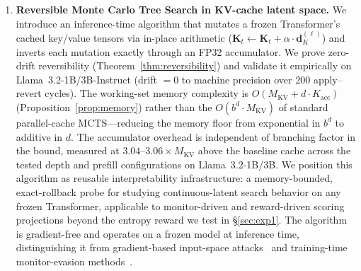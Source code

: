 \begin{enumerate}[leftmargin=*]
    \item \textbf{Reversible Monte Carlo Tree Search in KV-cache latent space.} We introduce an inference-time algorithm that mutates a frozen Transformer's cached key/value tensors via in-place arithmetic ($\mathbf{K}_t \leftarrow \mathbf{K}_t + \alpha \cdot \mathbf{d}_K^{(\ell)}$) and inverts each mutation exactly through an FP32 accumulator. We prove zero-drift reversibility (Theorem~\ref{thm:reversibility}) and validate it empirically on Llama~3.2-1B/3B-Instruct (drift $= 0$ to machine precision over 200 apply--revert cycles). The working-set memory complexity is $O(M_{\text{KV}} + d \cdot K_{\text{acc}})$ (Proposition~\ref{prop:memory}) rather than the $O(b^d \cdot M_{\text{KV}})$ of standard parallel-cache MCTS---reducing the memory floor from exponential in $b^d$ to additive in $d$. The accumulator overhead is independent of branching factor in the bound, measured at $3.04$--$3.06\times M_{\text{KV}}$ above the baseline cache across the tested depth and prefill configurations on Llama~3.2-1B/3B. We position this algorithm as reusable interpretability infrastructure: a memory-bounded, exact-rollback probe for studying continuous-latent search behavior on any frozen Transformer, applicable to monitor-driven and reward-driven scoring projections beyond the entropy reward we test in §\ref{sec:exp1}. The algorithm is gradient-free and operates on a frozen model at inference time, distinguishing it from gradient-based input-space attacks~\citep{zou2023gcg, bailey2024obfuscated} and training-time monitor-evasion methods~\citep{gupta2025rlobfuscation}.


\end{enumerate}
